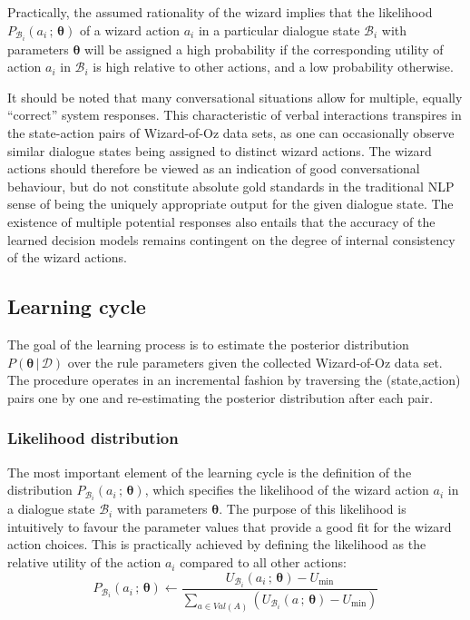 Practically, the assumed rationality of the wizard implies that the likelihood $P_{\mathcal{B}_i}(a_i \, ; \, \boldsymbol\theta)$ of a wizard action $a_i$ in a particular dialogue state $\mathcal{B}_i$ with parameters $\boldsymbol\theta$ will be assigned a high probability if the corresponding utility of action $a_i$ in $\mathcal{B}_i$ is high relative to other actions, and a low probability otherwise.  

It should be noted that many conversational situations allow for multiple, equally ``correct'' system responses.  This characteristic of verbal interactions transpires in the state-action pairs of Wizard-of-Oz data sets, as one can occasionally observe similar dialogue states being assigned to distinct wizard actions. The wizard actions should therefore be viewed as an indication of good conversational behaviour, but do not constitute absolute gold standards in the traditional NLP sense of being the uniquely appropriate output for the given dialogue state. The existence of multiple potential responses also entails that the accuracy of the learned decision models remains contingent on the degree of internal consistency of the wizard actions. 

\subsection{Learning cycle}
\label{sec:rule-supervised-learning}

The goal of the learning process is to estimate the posterior distribution $P(\boldsymbol\theta \, | \, \mathcal{D})$ over the rule parameters given the collected Wizard-of-Oz data set. The procedure operates in an incremental fashion by traversing the (state,action) pairs one by one and re-estimating the posterior distribution after each pair.  

\subsubsection*{Likelihood distribution}

The most important element of the learning cycle is the definition of the distribution $P_{\mathcal{B}_i}(a_i \, ; \, \boldsymbol\theta)$, which specifies the likelihood of the wizard action $a_i$ in a dialogue state $\mathcal{B}_i$ with parameters $\boldsymbol\theta$. The purpose of this likelihood is intuitively to favour the parameter values that provide a good fit for the wizard action choices. This is practically achieved by defining the likelihood as the relative utility of the action $a_i$ compared to all other actions: 
\begin{equation}
P_{\mathcal{B}_i}(a_i \, ; \, \boldsymbol\theta) \leftarrow \dfrac{U_{\mathcal{B}_i}(a_i \, ; \, \boldsymbol\theta) - U_{\mathrm{min}}}{\sum_{a \in Val(A)} (U_{\mathcal{B}_i}(a  \, ; \, \boldsymbol\theta) - U_{\mathrm{min}})} \label{eq:likelihood}
\end{equation}

